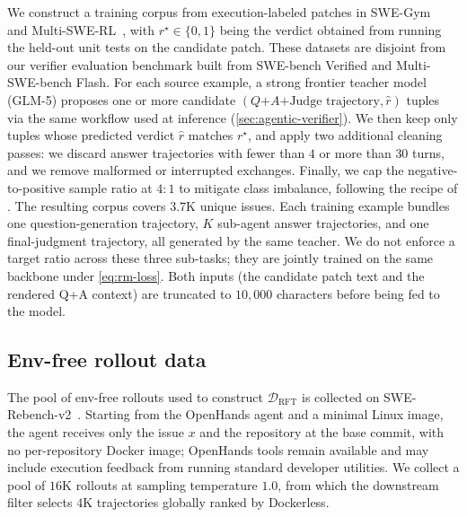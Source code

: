 \documentclass{llmxive}
\providecommand{\approach}{Dockerless\xspace}
\providecommand{\zeng}[1]{\textbf{[Zeng: #1]}}
\begin{document}
We construct a training corpus from execution-labeled patches in SWE-Gym~\citep{pan2025training} and Multi-SWE-RL~\citep{zan2026multi}, with $r^\star \in \{0, 1\}$ being the verdict obtained from running the held-out unit tests on the candidate patch.
These datasets are disjoint from our verifier evaluation benchmark built from SWE-bench Verified and Multi-SWE-bench Flash.
For each source example, a strong frontier teacher model (GLM-5) proposes one or more candidate $(Q\text{+}A\text{+Judge trajectory}, \hat{r})$ tuples via the same workflow used at inference (\cref{sec:agentic-verifier}).
We then keep only tuples whose predicted verdict $\hat{r}$ matches $r^\star$, and apply two additional cleaning passes: we discard answer trajectories with fewer than $4$ or more than $30$ turns, and we remove malformed or interrupted exchanges.
Finally, we cap the negative-to-positive sample ratio at $4{:}1$ to mitigate class imbalance, following the recipe of \citet{shum2025swe}.
The resulting corpus covers $3.7$K unique issues.
Each training example bundles one question-generation trajectory, $K$ sub-agent answer trajectories, and one final-judgment trajectory, all generated by the same teacher.
We do not enforce a target ratio across these three sub-tasks; they are jointly trained on the same backbone under \cref{eq:rm-loss}.
Both inputs (the candidate patch text and the rendered Q+A context) are truncated to $10{,}000$ characters before being fed to the model.

\subsection{Env-free rollout data}
\label{app:data-rollout}

The pool of env-free rollouts used to construct $\mathcal{D}_{\text{RFT}}$ is collected on SWE-Rebench-v2~\citep{badertdinov2026swev2}.
Starting from the OpenHands agent and a minimal Linux image, the agent receives only the issue $x$ and the repository at the base commit, with no per-repository Docker image; OpenHands tools remain available and may include execution feedback from running standard developer utilities.
We collect a pool of $16$K rollouts at sampling temperature $1.0$, from which the downstream filter selects $4$K trajectories globally ranked by \approach.
\end{document}

